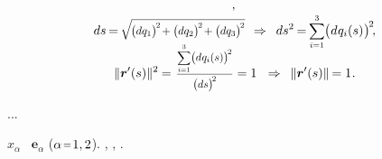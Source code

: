 \begin{gather*}
\hspace{-0.4ex} ,
\\[-0.3em]
%
ds \hspace{-0.2ex} = \hspace{-0.2ex} \scalebox{.88}{$ \displaystyle \sqrt{ \hspace{-0.2ex} \bigl( dq_1 \bigr)^{\hspace{-0.2ex}2} \hspace{-0.3ex} + \bigl( dq_2 \bigr)^{\hspace{-0.2ex}2} \hspace{-0.3ex} + \bigl( dq_3 \bigr)^{\hspace{-0.2ex}2} } $}
\hspace{.4em} \Rightarrow \hspace{.5em}
ds^2 \hspace{-0.2ex} = \hspace{-0.2ex} \scalebox{.88}{$ \displaystyle\sum_{i=1}^{3} $} \hspace{-0.1ex} \bigl( \hspace{.1ex} d \hspace{.1ex} q_{i}(s) \hspace{.1ex} \bigr)^{\hspace{-0.2ex}2}
\hspace{-0.4ex} ,
\\[-0.8em]
%
\| \locationvector'(s) \|^{2} \hspace{-0.1ex}
= \hspace{.2ex} \scalebox{.85}{$ \displaystyle\frac{\raisemath{-0.2em}{\scalebox{.88}{$ \displaystyle\sum_{i=1}^{3} $} \bigl( d \hspace{.1ex} q_{i}(s) \bigr)^{\hspace{-0.2ex}2}} }{\raisemath{-0.3em}{\bigl( ds \bigr)^{\hspace{-0.3ex}2}}} $}
= 1
\hspace{.6em} \Rightarrow \hspace{.5em}
\| \locationvector'(s) \| \hspace{-0.2ex} = 1
\hspace{.1ex} .
%
\end{gather*}

...

     $x_{\alpha}$  ~${\bm{e}_{\alpha}}$ (${\alpha \narroweq 1, 2}$).
  , ,   .

